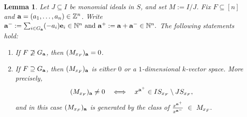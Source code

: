 \documentclass[12pt]{amsart}
\numberwithin{equation}{section}
\newtheorem{lemma}[theorem]{Lemma}
\theoremstyle{definition}
\theoremstyle{definition}
\newcommand{\ZZ}{{\mathbb Z}}
\newcommand{\NN}{{\mathbb N}}
\def\a{{\bold a}}
\def\e{{\bold e}}
\begin{document}
\begin{lemma}\label{lem:gradedpiece-dim1}
	Let $J\subseteq I$ be monomial ideals in $S$, and set $M:=I/J$.
	Fix $F\subseteq[n]$ and $\a = (a_1, \dots, a_n) \in\ZZ^n$. Write $\a^-:=\sum_{i\in G_\a}(-a_i)\e_i\in\NN^n \text{ and } \a^+:=\a+\a^-\in\NN^n.$
	The following statements hold:
	\begin{enumerate}
		\item[(1)] If $F\not\supseteq G_\a$, then $(M_{x_F})_\a=0$.
		\item[(2)] If $F\supseteq G_\a$, then $(M_{x_F})_\a$ is either $0$ or a $1$-dimensional
		$k$-vector space. More precisely,
		\[
		(M_{x_F})_\a\neq 0
		\quad\Longleftrightarrow\quad
		x^{\a^+}\in I S_{x_F}\setminus J S_{x_F},
		\]
		and in this case $(M_{x_F})_\a$ is generated by the class of $\frac{x^{\a^+}}{x^{\a^-}}\ \in\ M_{x_F}.$
	\end{enumerate}
\end{lemma}
\end{document}
